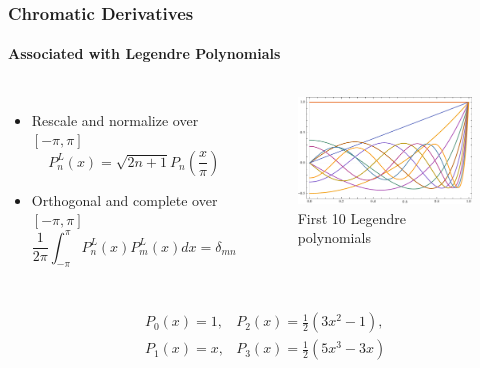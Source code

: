 \documentclass{beamer}
\begin{document}


\begin{frame}
\frametitle{Chromatic Derivatives}
\framesubtitle{Associated with Legendre Polynomials}
\begin{columns}[c]
\begin{itemize}
	\item Rescale and normalize
		over $[-\pi, \pi]$
	\begin{equation*}
		P_n^L(x) = \sqrt{2n+1}P_n\left(\frac{x}{\pi}\right)
	\end{equation*}
	\item \alert{Orthogonal} and \alert{complete} over $[-\pi, \pi]$
	\begin{equation*}
		\frac{1}{2\pi} \int_{-\pi}^{\pi} P_n^L(x) P_m^L(x) dx = \delta_{mn}
	\end{equation*}
\end{itemize}
\begin{figure} %
\centering
	\includegraphics[width=\columnwidth]{../figures/legendre}
\caption{First 10 Legendre polynomials}
\end{figure}
\end{columns}
\pause
\begin{example}
\begin{align*}
& P_0(x) = 1, & P_2(x) = \frac{1}{2}(3x^2-1), \\
& P_1(x) = x, 
& P_3(x) = \frac{1}{2}(5x^3-3x)
\end{align*}
\end{example}
\end{frame}

\end{document}
